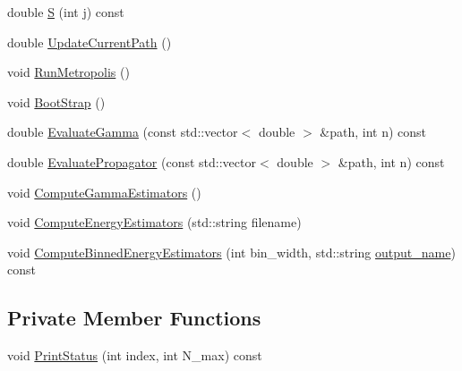 \begin{DoxyCompactItemize}
double \hyperlink{classMetropolis_afb509c80a84817bf9b4ff183e02a44cb}{S} (int j) const
\item 
double \hyperlink{classMetropolis_a79beaf1cf27f27cd43b7d1d03289d301}{Update\+Current\+Path} ()
\item 
void \hyperlink{classMetropolis_adaa45159158dd78986b830930c3b0b9e}{Run\+Metropolis} ()
\item 
void \hyperlink{classMetropolis_ac0891905d6107b4b442455579314279c}{Boot\+Strap} ()
\item 
double \hyperlink{classMetropolis_adf0ef3e12d4ce4185d3a536649de5cee}{Evaluate\+Gamma} (const std\+::vector$<$ double $>$ \&path, int n) const
\item 
double \hyperlink{classMetropolis_aa0e41567dcbb736f1bcc4a09dbb5f6fb}{Evaluate\+Propagator} (const std\+::vector$<$ double $>$ \&path, int n) const
\item 
void \hyperlink{classMetropolis_aa8fc09048815c71e0a94f314afd631cc}{Compute\+Gamma\+Estimators} ()
\item 
void \hyperlink{classMetropolis_a197d44f9109ce75781a70441f1d0b2b2}{Compute\+Energy\+Estimators} (std\+::string filename)
\item 
void \hyperlink{classMetropolis_aa733da324aa14e6c2fcf9c75f5643cbe}{Compute\+Binned\+Energy\+Estimators} (int bin\+\_\+width, std\+::string \hyperlink{SETTINGS_8h_a4bfaa4b497cb5e62d0cfc56f5ce8cfc9}{output\+\_\+name}) const
\end{DoxyCompactItemize}
\subsection*{Private Member Functions}
\begin{DoxyCompactItemize}
\item 
void \hyperlink{classMetropolis_abfc33a0d7604c24e0337e8a16fa60971}{Print\+Status} (int index, int N\+\_\+max) const
\end{DoxyCompactItemize}

